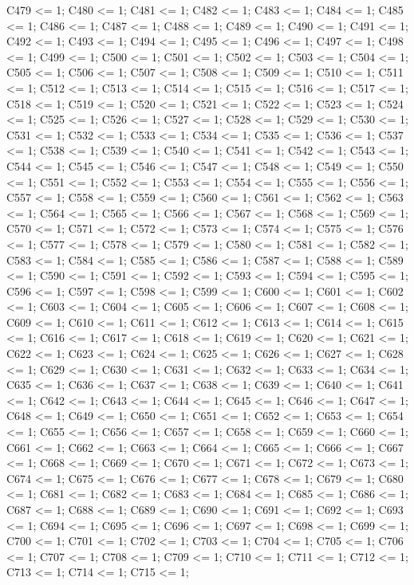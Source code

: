 C479 <= 1;
C480 <= 1;
C481 <= 1;
C482 <= 1;
C483 <= 1;
C484 <= 1;
C485 <= 1;
C486 <= 1;
C487 <= 1;
C488 <= 1;
C489 <= 1;
C490 <= 1;
C491 <= 1;
C492 <= 1;
C493 <= 1;
C494 <= 1;
C495 <= 1;
C496 <= 1;
C497 <= 1;
C498 <= 1;
C499 <= 1;
C500 <= 1;
C501 <= 1;
C502 <= 1;
C503 <= 1;
C504 <= 1;
C505 <= 1;
C506 <= 1;
C507 <= 1;
C508 <= 1;
C509 <= 1;
C510 <= 1;
C511 <= 1;
C512 <= 1;
C513 <= 1;
C514 <= 1;
C515 <= 1;
C516 <= 1;
C517 <= 1;
C518 <= 1;
C519 <= 1;
C520 <= 1;
C521 <= 1;
C522 <= 1;
C523 <= 1;
C524 <= 1;
C525 <= 1;
C526 <= 1;
C527 <= 1;
C528 <= 1;
C529 <= 1;
C530 <= 1;
C531 <= 1;
C532 <= 1;
C533 <= 1;
C534 <= 1;
C535 <= 1;
C536 <= 1;
C537 <= 1;
C538 <= 1;
C539 <= 1;
C540 <= 1;
C541 <= 1;
C542 <= 1;
C543 <= 1;
C544 <= 1;
C545 <= 1;
C546 <= 1;
C547 <= 1;
C548 <= 1;
C549 <= 1;
C550 <= 1;
C551 <= 1;
C552 <= 1;
C553 <= 1;
C554 <= 1;
C555 <= 1;
C556 <= 1;
C557 <= 1;
C558 <= 1;
C559 <= 1;
C560 <= 1;
C561 <= 1;
C562 <= 1;
C563 <= 1;
C564 <= 1;
C565 <= 1;
C566 <= 1;
C567 <= 1;
C568 <= 1;
C569 <= 1;
C570 <= 1;
C571 <= 1;
C572 <= 1;
C573 <= 1;
C574 <= 1;
C575 <= 1;
C576 <= 1;
C577 <= 1;
C578 <= 1;
C579 <= 1;
C580 <= 1;
C581 <= 1;
C582 <= 1;
C583 <= 1;
C584 <= 1;
C585 <= 1;
C586 <= 1;
C587 <= 1;
C588 <= 1;
C589 <= 1;
C590 <= 1;
C591 <= 1;
C592 <= 1;
C593 <= 1;
C594 <= 1;
C595 <= 1;
C596 <= 1;
C597 <= 1;
C598 <= 1;
C599 <= 1;
C600 <= 1;
C601 <= 1;
C602 <= 1;
C603 <= 1;
C604 <= 1;
C605 <= 1;
C606 <= 1;
C607 <= 1;
C608 <= 1;
C609 <= 1;
C610 <= 1;
C611 <= 1;
C612 <= 1;
C613 <= 1;
C614 <= 1;
C615 <= 1;
C616 <= 1;
C617 <= 1;
C618 <= 1;
C619 <= 1;
C620 <= 1;
C621 <= 1;
C622 <= 1;
C623 <= 1;
C624 <= 1;
C625 <= 1;
C626 <= 1;
C627 <= 1;
C628 <= 1;
C629 <= 1;
C630 <= 1;
C631 <= 1;
C632 <= 1;
C633 <= 1;
C634 <= 1;
C635 <= 1;
C636 <= 1;
C637 <= 1;
C638 <= 1;
C639 <= 1;
C640 <= 1;
C641 <= 1;
C642 <= 1;
C643 <= 1;
C644 <= 1;
C645 <= 1;
C646 <= 1;
C647 <= 1;
C648 <= 1;
C649 <= 1;
C650 <= 1;
C651 <= 1;
C652 <= 1;
C653 <= 1;
C654 <= 1;
C655 <= 1;
C656 <= 1;
C657 <= 1;
C658 <= 1;
C659 <= 1;
C660 <= 1;
C661 <= 1;
C662 <= 1;
C663 <= 1;
C664 <= 1;
C665 <= 1;
C666 <= 1;
C667 <= 1;
C668 <= 1;
C669 <= 1;
C670 <= 1;
C671 <= 1;
C672 <= 1;
C673 <= 1;
C674 <= 1;
C675 <= 1;
C676 <= 1;
C677 <= 1;
C678 <= 1;
C679 <= 1;
C680 <= 1;
C681 <= 1;
C682 <= 1;
C683 <= 1;
C684 <= 1;
C685 <= 1;
C686 <= 1;
C687 <= 1;
C688 <= 1;
C689 <= 1;
C690 <= 1;
C691 <= 1;
C692 <= 1;
C693 <= 1;
C694 <= 1;
C695 <= 1;
C696 <= 1;
C697 <= 1;
C698 <= 1;
C699 <= 1;
C700 <= 1;
C701 <= 1;
C702 <= 1;
C703 <= 1;
C704 <= 1;
C705 <= 1;
C706 <= 1;
C707 <= 1;
C708 <= 1;
C709 <= 1;
C710 <= 1;
C711 <= 1;
C712 <= 1;
C713 <= 1;
C714 <= 1;
C715 <= 1;
